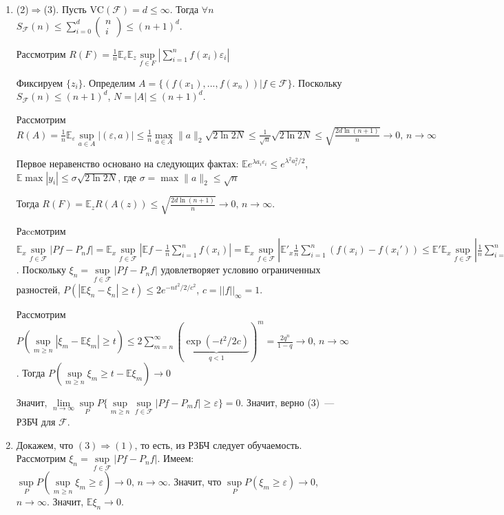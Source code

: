 \documentclass[a4paper]{article}
\newcommand{\VC}{\mbox{VC}}
\newcommand{\F}{\mathcal{F}}
\newcommand{\E}{\mathbb{E}}
\def\eps{\varepsilon}
\begin{document}
\begin{enumerate}
\item (2)$\Rightarrow$(3). Пусть $\VC(\F)=d\leqslant\infty$. Тогда $\forall n$ $S_\F(n)\leqslant \sum\limits_{i=0}^d\left(\begin{array}{c}n\\i\end{array}\right)\leqslant (n+1)^d$.

Рассмотрим $R(F)=\frac{1}{n}\E_\eps\E_z\sup\limits_{f\in F}|\sum\limits_{i=1}^n f(x_i)\eps_i|$

Фиксируем $\{z_i\}$. Определим $A=\{\left(f(x_1),...,f(x_n)\right) \big| f\in \F\}$. Поскольку $S_\F(n)\leqslant (n+1)^d$, $N=|A|\leqslant (n+1)^d$.

Рассмотрим $R(A)=\frac{1}{n}\E_\eps\sup\limits_{a\in A}|(\eps, a)|\leqslant\frac{1}{n}\max\limits_{a\in A}\|a\|_2\sqrt{2\ln 2N}\leqslant \frac{1}{\sqrt{n}}\sqrt{2\ln 2N}\leqslant\sqrt{\frac{2d\ln (n+1)}{n}}\to 0,\,n\to\infty$

Первое неравенство основано на следующих фактах: $\E e^{\lambda a_i\eps_i}\leqslant e^{\lambda^2 a_i^2/2}$, $\E\max |y_i|\leqslant\sigma\sqrt{2\ln 2N}$, где $\sigma=\max \|a\|_2\leqslant\sqrt{n}$

Тогда $R(F)=\E_z R(A(z))\leqslant\sqrt{\frac{2d\ln (n+1)}{n}}\to 0,\,n\to\infty$.

Раccмотрим $\mathbb{E}_x\sup\limits_{f\in \F}|Pf-P_nf|=\E_x\sup\limits_{f\in\F}|\E f-\frac{1}{n}\sum\limits_{i=1}^n f(x_i)|=\E_x\sup\limits_{f\in\F}|\E'_x \frac{1}{n}\sum\limits_{i=1}^n (f(x_i)-f(x_i'))\leqslant\E'\E_x\sup\limits_{f\in\F}| \frac{1}{n}\sum\limits_{i=1}^n (f(x_i)-f(x_i')|=\E'_x\E_x\E_\eps\sup\limits_{f\in\F}| \frac{1}{n}\sum\limits_{i=1}^n (\eps_i(f(x_i)-f(x_i'))|\leqslant 2R(\F)\to 0,\,n\to\infty$. Поскольку $\xi_n=\sup\limits_{f\in \F}|Pf-P_nf|$ удовлетворяет условию ограниченных разностей, $P(|\E \xi_n-\xi_n|\geqslant t)\leqslant 2e^{-nt^2/2/c^2}$, $c=||f||_\infty=1$.

Рассмотрим $P(\sup\limits_{m\geqslant n}|\xi_m-\E\xi_m|\geqslant t)\leqslant 2\sum\limits_{m=n}^\infty (\underbrace{\exp(-t^2/2c)}_{q<1})^m=\frac{2q^n}{1-q}\to 0,\,n\to\infty$. Тогда $P(\sup\limits_{m\geqslant n}\xi_m\geqslant t-\E\xi_m)\to 0$

Значит, $\lim\limits_{n\to\infty}\sup\limits_P P\{\sup\limits_{m\geqslant n}\sup\limits_{f\in\F}|Pf-P_mf|\geqslant\eps\}=0$. Значит, верно (3)~--- РЗБЧ для $\F$.

\item Докажем, что $(3)\Rightarrow(1)$, то есть, из РЗБЧ следует обучаемость. Рассмотрим $\xi_n=\sup\limits_{f\in\F}|Pf-P_nf|$. Имеем: $\sup\limits_PP(\sup\limits_{m\geqslant n}\xi_m\geqslant\eps)\to 0,\,n\to\infty$. Значит, что $\sup\limits_P P(\xi_m\geqslant \eps)\to 0$, $n\to\infty$. Значит, $\E\xi_n\to 0$.


\end{enumerate}
\end{document}
